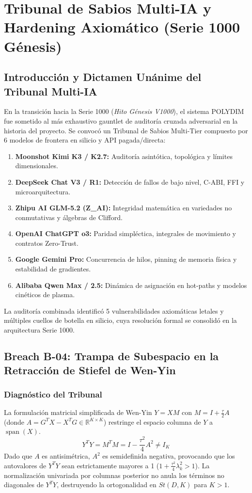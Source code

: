 \chapter{Tribunal de Sabios Multi-IA y Hardening Axiomático (Serie 1000 Génesis)}
\label{cap:v1000_tribunal_multi_ia_hardening}

\section{Introducción y Dictamen Unánime del Tribunal Multi-IA}
En la transición hacia la Serie 1000 (\textit{Hito Génesis V1000}), el sistema POLYDIM fue sometido al más exhaustivo gauntlet de auditoría cruzada adversarial en la historia del proyecto. Se convocó un Tribunal de Sabios Multi-Tier compuesto por 6 modelos de frontera en silicio y API pagada/directa:
\begin{enumerate}
    \item \textbf{Moonshot Kimi K3 / K2.7:} Auditoría asintótica, topológica y límites dimensionales.
    \item \textbf{DeepSeek Chat V3 / R1:} Detección de fallos de bajo nivel, C-ABI, FFI y microarquitectura.
    \item \textbf{Zhipu AI GLM-5.2 (Z\_AI):} Integridad matemática en variedades no conmutativas y álgebras de Clifford.
    \item \textbf{OpenAI ChatGPT o3:} Paridad simpléctica, integrales de movimiento y contratos Zero-Trust.
    \item \textbf{Google Gemini Pro:} Concurrencia de hilos, pinning de memoria física y estabilidad de gradientes.
    \item \textbf{Alibaba Qwen Max / 2.5:} Dinámica de asignación en hot-paths y modelos cinéticos de plasma.
\end{enumerate}

La auditoría combinada identificó 5 vulnerabilidades axiomáticas letales y múltiples cuellos de botella en silicio, cuya resolución formal se consolidó en la arquitectura Serie 1000.

\section{Breach B-04: Trampa de Subespacio en la Retracción de Stiefel de Wen-Yin}
\subsection{Diagnóstico del Tribunal}
La formulación matricial simplificada de Wen-Yin $Y = X M$ con $M = I + \frac{\tau}{2} A$ (donde $A = G^T X - X^T G \in \mathbb{R}^{K \times K}$) restringe el espacio columna de $Y$ a $\operatorname{span}(X)$.
\begin{equation}
Y^T Y = M^T M = I - \frac{\tau^2}{4} A^2 \neq I_K
\end{equation}
Dado que $A$ es antisimétrica, $A^2$ es semidefinida negativa, provocando que los autovalores de $Y^T Y$ sean estrictamente mayores a 1 ($1 + \frac{\tau^2}{4} \lambda_k^2 > 1$). La normalización univariada por columnas posterior no anula los términos no diagonales de $Y^T Y$, destruyendo la ortogonalidad en $St(D, K)$ para $K > 1$.


